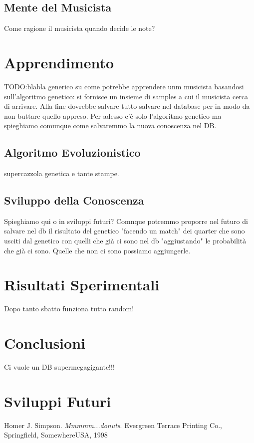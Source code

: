 \documentclass[a4paper,10pt]{article}
\begin{document}
\subsection{Mente del Musicista}
Come ragione il musicista quando decide le note?

\section{Apprendimento}
TODO:blabla generico su come potrebbe apprendere unm musicista basandosi sull'algoritmo genetico:
si fornisce un insieme di samples a cui il musicista cerca di arrivare. 
Alla fine dovrebbe salvare tutto salvare nel database per in modo da non buttare quello appreso.
Per adesso c'è solo l'algoritmo genetico ma spieghiamo comunque come salvaremmo la nuova conoscenza nel DB.  
\subsection{Algoritmo Evoluzionistico}
supercazzola genetica e tante stampe.
\subsection{Sviluppo della Conoscenza}
Spieghiamo qui o in sviluppi futuri? Comnque potremmo proporre nel futuro di salvare nel db 
il risultato del genetico "facendo un match" dei quarter che sono usciti dal genetico con quelli che già
ci sono nel db "aggiustando" le probabilità che già ci sono. Quelle che non ci sono possiamo aggiungerle. 

\section{Risultati Sperimentali}
Dopo tanto sbatto funziona tutto random!

\section{Conclusioni}
Ci vuole un DB supermegagigante!!!

\section{Sviluppi Futuri}

\begin{thebibliography}{50}
   Homer J. Simpson. \textsl{Mmmmm...donuts}.
		Evergreen Terrace Printing Co., Springfield, SomewhereUSA, 1998
\end{thebibliography}
\end{document}
